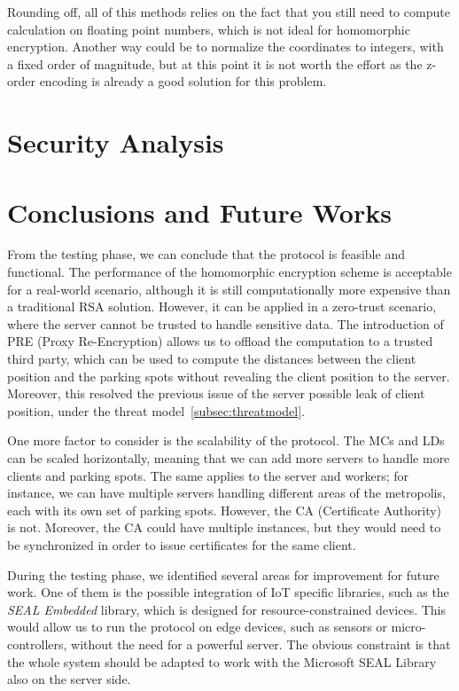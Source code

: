 Rounding off, all of this methods relies on the fact that you still need to compute calculation on floating point numbers, which is not ideal for homomorphic encryption. Another way could be to normalize the coordinates to integers, with a fixed order of magnitude, but at this point it is not worth the effort as the z-order encoding is already a good solution for this problem.


\section{Security Analysis}



\section{Conclusions and Future Works}

From the testing phase, we can conclude that the protocol is feasible and functional. The performance of the homomorphic encryption scheme is acceptable for a real-world scenario, although it is still computationally more expensive than a traditional RSA solution. However, it can be applied in a zero-trust scenario, where the server cannot be trusted to handle sensitive data. The introduction of PRE (Proxy Re-Encryption) allows us to offload the computation to a trusted third party, which can be used to compute the distances between the client position and the parking spots without revealing the client position to the server. Moreover, this resolved the previous issue of the server possible leak of client position, under the threat model~\cref{subsec:threatmodel}.

One more factor to consider is the scalability of the protocol. The MCs and LDs can be scaled horizontally, meaning that we can add more servers to handle more clients and parking spots. The same applies to the server and workers; for instance, we can have multiple servers handling different areas of the metropolis, each with its own set of parking spots. However, the CA (Certificate Authority) is not. Moreover, the CA could have multiple instances, but they would need to be synchronized in order to issue certificates for the same client.

During the testing phase, we identified several areas for improvement for future work. One of them is the possible integration of IoT specific libraries, such as the \emph{SEAL Embedded} \cite{sealembedded} library, which is designed for resource-constrained devices. This would allow us to run the protocol on edge devices, such as sensors or micro-controllers, without the need for a powerful server. The obvious constraint is that the whole system should be adapted to work with the Microsoft SEAL\cite{sealcrypto} Library also on the server side. 

